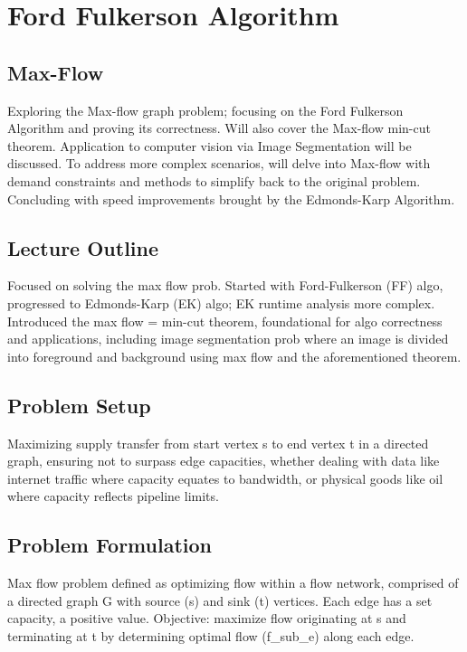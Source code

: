 \section*{Ford Fulkerson Algorithm}

\subsection*{Max-Flow}
Exploring the Max-flow graph problem; focusing on the Ford Fulkerson Algorithm and proving its correctness.
Will also cover the Max-flow min-cut theorem.
Application to computer vision via Image Segmentation will be discussed.
To address more complex scenarios, will delve into Max-flow with demand constraints and methods to simplify back to the original problem.
Concluding with speed improvements brought by the Edmonds-Karp Algorithm.

\subsection*{Lecture Outline}
Focused on solving the max flow prob.
Started with Ford-Fulkerson (FF) algo, progressed to Edmonds-Karp (EK) algo; EK runtime analysis more complex.
Introduced the max flow = min-cut theorem, foundational for algo correctness and applications, including image segmentation prob where an image is divided into foreground and background using max flow and the aforementioned theorem.

\subsection*{Problem Setup}
Maximizing supply transfer from start vertex s to end vertex t in a directed graph, ensuring not to surpass edge capacities, whether dealing with data like internet traffic where capacity equates to bandwidth, or physical goods like oil where capacity reflects pipeline limits.

\subsection*{Problem Formulation}
Max flow problem defined as optimizing flow within a flow network, comprised of a directed graph G with source (s) and sink (t) vertices.
Each edge has a set capacity, a positive value.
Objective: maximize flow originating at s and terminating at t by determining optimal flow (f\_sub\_e) along each edge.

